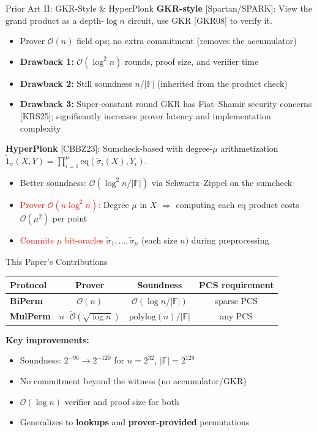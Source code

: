 \documentclass[aspectratio=169,10pt]{beamer}
\newcommand{\F}{\mathbb{F}}
\newcommand{\eq}{\mathrm{eq}}
\newcommand{\wt}[1]{\widetilde{#1}}
\newcommand{\bigO}{\mathcal{O}}
\newcommand{\polylog}{\mathrm{polylog}}
\begin{document}
\begin{frame}{Prior Art II: GKR-Style \& HyperPlonk}
\textbf{GKR-style} [Spartan/SPARK]: View the grand product as a depth-$\log n$ circuit, use GKR [GKR08] to verify it.
\begin{itemize}
  \item \textcolor{green!60!black}{Prover $\bigO(n)$} field ops; \textcolor{green!60!black}{no extra commitment} (removes the accumulator)
  \item \textbf{Drawback 1:} $\bigO(\log^2 n)$ rounds, proof size, and verifier time
  \item \textbf{Drawback 2:} Still soundness $n / |\F|$ (inherited from the product check)
  \item \textbf{Drawback 3:} Super-constant round GKR has Fiat--Shamir security concerns [KRS25]; significantly increases prover latency and implementation complexity
\end{itemize}

\vspace{0.4em}
\textbf{HyperPlonk} [CBBZ23]: Sumcheck-based with degree-$\mu$ arithmetization $\wt{1}_\sigma(X,Y) = \prod_{i=1}^{\mu} \eq(\wt{\sigma}_i(X), Y_i)$.
\begin{itemize}
  \item \textcolor{green!60!black}{Better soundness:} $\bigO(\log^2 n / |\F|)$ via Schwartz--Zippel on the sumcheck
  \item \textcolor{red}{Prover $\bigO(n \log^2 n)$:} Degree $\mu$ in $X$ $\Rightarrow$ computing each $\eq$ product costs $\bigO(\mu^2)$ per point
  \item \textcolor{red}{Commits $\mu$ bit-oracles} $\wt{\sigma}_1, \ldots, \wt{\sigma}_\mu$ (each size $n$) during preprocessing
\end{itemize}
\end{frame}

\begin{frame}{This Paper's Contributions}
\begin{center}
\begin{tabular}{lccc}
\toprule
Protocol & Prover & Soundness & PCS requirement \\
\midrule
\textbf{BiPerm} & $\bigO(n)$ & $\bigO(\log n / |\F|)$ & sparse PCS \\
\textbf{MulPerm} & $n \cdot \widetilde{\bigO}(\sqrt{\log n})$ & $\polylog(n) / |\F|$ & any PCS \\
\bottomrule
\end{tabular}
\end{center}

\vspace{0.6em}
\textbf{Key improvements:}
\begin{itemize}
  \item Soundness: $2^{-96} \to 2^{-120}$ for $n = 2^{32}$, $|\F| = 2^{128}$
  \item No commitment beyond the witness (no accumulator/GKR)
  \item $\bigO(\log n)$ verifier and proof size for both
  \item Generalizes to \textbf{lookups} and \textbf{prover-provided} permutations
\end{itemize}
\end{frame}
\end{document}
